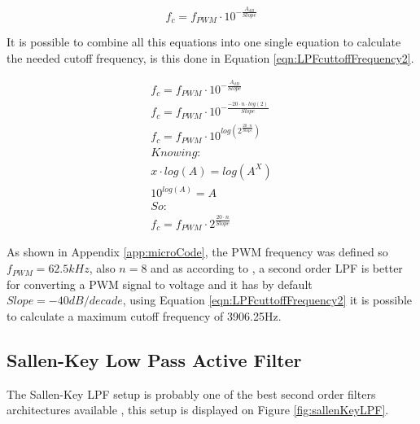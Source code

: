 			\begin{equation}\label{eqn:LPFcuttoffFrequency}
				f_{c}=f_{PWM} \cdot 10^{-\frac{A_{dB}}{Slope}}
			\end{equation}

		It is possible to combine all this equations into one single equation to calculate the needed cutoff frequency, is this done in Equation \ref{eqn:LPFcuttoffFrequency2}.

			\begin{equation}\label{eqn:LPFcuttoffFrequency2}
				\begin{split}
					f_{c}=f_{PWM} \cdot 10^{-\frac{A_{dB}}{Slope}}	\\
					f_{c}=f_{PWM} \cdot 10^{-\frac{-20 \cdot n \cdot log \left( 2 \right)}{Slope}}	\\
					f_{c}=f_{PWM} \cdot 10^{log \left( 2^{\frac{20 \cdot n }{Slope}} \right)}	\\
					Knowing:	\\
					x \cdot log \left( A \right) =  log \left( A^{X} \right) \\
					10^{log \left( A \right) } = A	\\
					So:	\\
					f_{c}=f_{PWM} \cdot  2^{\frac{20 \cdot n}{Slope}}
				\end{split}
			\end{equation}

	
		As shown in Appendix \ref{app:microCode}, the PWM frequency was defined so $f_{PWM}=62.5kHz$, also $n=8$ and as according to \cite{metivier2013pwm}, a second order LPF is better for converting a PWM signal to voltage and it has by default $Slope=-40dB/decade$, using Equation \ref{eqn:LPFcuttoffFrequency2} it is possible to calculate a maximum cutoff frequency of 3906.25Hz. 

	\subsection{Sallen-Key Low Pass Active Filter}\label{ssec:sallen-key-low-pass-active-filter}
	
		The Sallen-Key LPF setup is probably one of the best second order filters architectures available \cite{dorfSvodoba2014}, this setup is displayed on Figure \ref{fig:sallenKeyLPF}.

